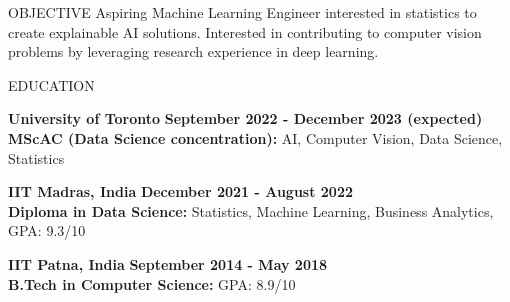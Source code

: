 \documentclass{resume}
\begin{document}
  \begin{rSection}{OBJECTIVE}
    Aspiring Machine Learning Engineer interested in statistics to create explainable AI solutions.
    Interested in contributing to computer vision problems by leveraging research experience in deep learning.
  \end{rSection}

  \begin{rSection}{EDUCATION}

    {\bf University of Toronto} \hfill {\bf September 2022 - December 2023 (expected)} \\
    {\bf MScAC (Data Science concentration):} AI, Computer Vision, Data Science, Statistics

    {\bf IIT Madras, India} \hfill {\bf December 2021 - August 2022} \\
    {\bf Diploma in Data Science:} Statistics, Machine Learning, Business Analytics, GPA: 9.3/10

    {\bf IIT Patna, India} \hfill {\bf September 2014 - May 2018} \\
    {\bf B.Tech in Computer Science:} GPA: 8.9/10

  \end{rSection}
\end{document}
